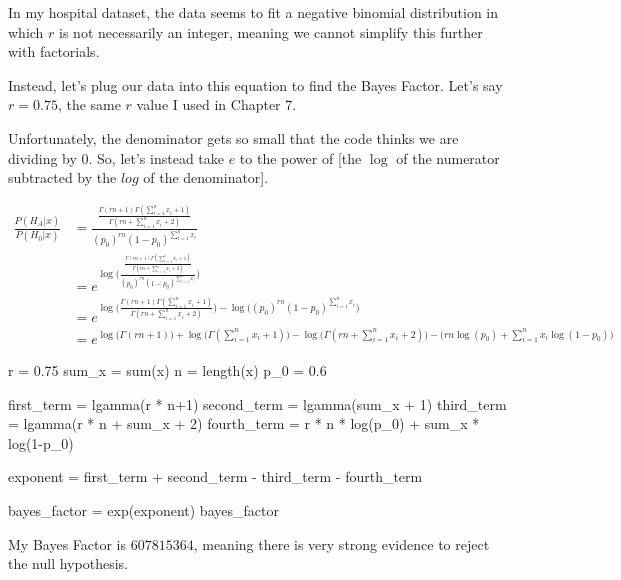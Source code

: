 \documentclass[
  letterpaper,
  DIV=11,
  numbers=noendperiod]{scrreprt}
\newenvironment{Shaded}{\begin{snugshade}}{\end{snugshade}}
\newcommand{\NormalTok}[1]{\textcolor[rgb]{0.00,0.23,0.31}{#1}}
\begin{document}
In my hospital dataset, the data seems to fit a negative binomial
distribution in which \(r\) is not necessarily an integer, meaning we
cannot simplify this further with factorials.

Instead, let's plug our data into this equation to find the Bayes
Factor. Let's say \(r = 0.75\), the same \(r\) value I used in Chapter
7.

Unfortunately, the denominator gets so small that the code thinks we are
dividing by \(0\). So, let's instead take \(e\) to the power of {[}the
\(\log\) of the numerator subtracted by the \(log\) of the
denominator{]}.

\[
\begin{aligned}
\frac{P(H_A | x)}{P(H_0 | x)}
&= \frac{\frac{\Gamma(rn + 1) \Gamma\left(\sum_{i=1}^n x_i + 1\right)}{\Gamma\left(rn + \sum_{i=1}^n x_i + 2\right)}}{(p_0)^{rn} (1 - p_0)^{\sum_{i=1}^n x_i}} \\
&= e^{\log \Bigg( \frac{\frac{\Gamma(rn + 1) \Gamma\left(\sum_{i=1}^n x_i + 1\right)}{\Gamma\left(rn + \sum_{i=1}^n x_i + 2\right)}}{(p_0)^{rn} (1 - p_0)^{\sum_{i=1}^n x_i}} \Bigg)} \\
&= e^{\log \Big( \frac{\Gamma(rn + 1) \Gamma\left(\sum_{i=1}^n x_i + 1\right)}{\Gamma\left(rn + \sum_{i=1}^n x_i + 2\right)} \Big) - \log\Big( (p_0)^{rn} (1 - p_0)^{\sum_{i=1}^n x_i} \Big)} \\
&= e^{\log \Big(\Gamma(rn + 1) \Big) + \log \Big( \Gamma\left(\sum_{i=1}^n x_i + 1\right)\Big) - \log \Big(\Gamma\left(rn + \sum_{i=1}^n x_i + 2\right) \Big) - \Big(rn\log(p_0) + {\sum_{i=1}^n x_i}\log(1 - p_0) \Big)}
\end{aligned}
\]

\begin{Shaded}
\begin{Highlighting}[]
\NormalTok{r = 0.75}
\NormalTok{sum\_x = sum(x)}
\NormalTok{n = length(x)}
\NormalTok{p\_0 = 0.6}

\NormalTok{first\_term = lgamma(r * n+1)}
\NormalTok{second\_term = lgamma(sum\_x + 1)}
\NormalTok{third\_term = lgamma(r * n + sum\_x + 2)}
\NormalTok{fourth\_term = r * n * log(p\_0) + sum\_x * log(1{-}p\_0)}

\NormalTok{exponent = first\_term + second\_term {-} third\_term {-} fourth\_term}

\NormalTok{bayes\_factor = exp(exponent)}
\NormalTok{bayes\_factor}
\end{Highlighting}
\end{Shaded}

My Bayes Factor is \(607815364\), meaning there is very strong evidence
to reject the null hypothesis.
\end{document}

